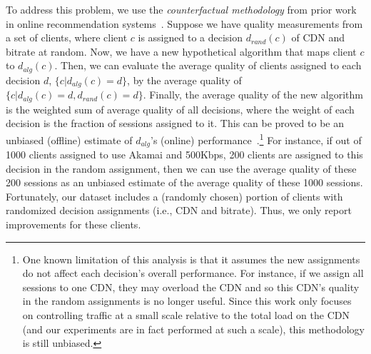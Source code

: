 To address this problem, we use the 
{\em counterfactual methodology} from prior work in 
online recommendation 
systems~\cite{li2010contextual,li2011unbiased}.
Suppose we have quality measurements from a 
set of clients,
where client $c$ is assigned to a decision $d_{rand}(c)$ 
of CDN and bitrate at random.
Now, we have a new hypothetical algorithm that maps 
client $c$ to $d_{alg}(c)$. 
Then, we can evaluate the average quality of clients 
assigned to each decision $d$,  $\{c|d_{alg}(c)=d\}$, 
by the average quality of $\{c|d_{alg}(c)=d,d_{rand}(c)=d\}$.
Finally, the average quality of the new algorithm is 
the weighted sum of average quality of all decisions, 
where the weight of each decision is the fraction of 
sessions assigned to it.
This can be proved to be an unbiased (offline) 
estimate of $d_{alg}$'s (online) 
performance~\cite{cfe-report}.\footnote{One known 
limitation of this analysis is that it assumes the new 
assignments do not affect each decision's overall 
performance. 
For instance, if we assign all sessions to one CDN, 
they may overload the CDN and so this CDN's quality 
in the random assignments is no longer useful. 
Since this work only focuses on controlling traffic at a 
small scale relative to the total load on the CDN (and 
our experiments are in fact performed at such a scale), 
this methodology is still unbiased.}
For instance, if out of 1000 clients assigned to use 
Akamai and 500Kbps, 200 clients are assigned to this 
decision in the random assignment, then we can use 
the average quality of these 200 sessions as an unbiased
estimate of the average quality of these 1000 sessions.
Fortunately, our dataset includes a (randomly chosen) 
portion of clients with randomized decision assignments 
(i.e., CDN and bitrate). 
Thus, we  only report improvements  for these clients. 



